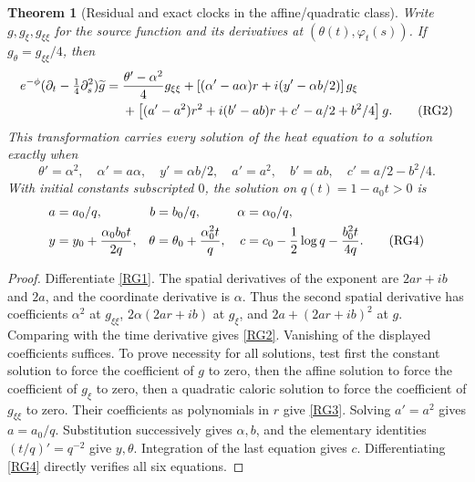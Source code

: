 \documentclass[11pt,a4paper]{article}
\newtheorem{theorem}{Theorem}[section]
\theoremstyle{definition}\newtheorem{definition}[theorem]{Definition}
\begin{document}
\begin{theorem}[Residual and exact clocks in the affine/quadratic class]
Write $g,g_\xi,g_{\xi\xi}$ for the source function and its derivatives at $(\theta(t),\varphi_t(s))$. If $g_\theta=g_{\xi\xi}/4$, then
\begin{align}
 e^{-\phi}(\partial_t-\tfrac14\partial_s^2)\widetilde g
 ={}&\frac{\theta'-\alpha^2}{4}g_{\xi\xi}
 +\left[(\alpha'-a\alpha)r+i(y'-\alpha b/2)\right]g_\xi\notag\\
 &+\left[(a'-a^2)r^2+i(b'-ab)r+c'-a/2+b^2/4\right]g.
                                                               \tag{RG2}\label{RG2}
\end{align}
This transformation carries \emph{every} solution of the heat equation to a solution exactly when
\begin{equation}
 \theta'=\alpha^2,\quad \alpha'=a\alpha,\quad
 y'=\alpha b/2,\quad a'=a^2,\quad b'=ab,\quad
 c'=a/2-b^2/4.                                                 \tag{RG3}\label{RG3}
\end{equation}
With initial constants subscripted $0$, the solution on $q(t)=1-a_0t>0$ is
\begin{align}
 a&=a_0/q,&b&=b_0/q,&\alpha&=\alpha_0/q,\notag\\
 y&=y_0+\frac{\alpha_0b_0t}{2q},&
 \theta&=\theta_0+\frac{\alpha_0^2t}{q},&
 c&=c_0-\frac12\log q-\frac{b_0^2t}{4q}.                      \tag{RG4}\label{RG4}
\end{align}
\end{theorem}
\begin{proof}
Differentiate \eqref{RG1}. The spatial derivatives of the exponent are $2ar+ib$ and $2a$, and the coordinate derivative is $\alpha$. Thus the second spatial derivative has coefficients $\alpha^2$ at $g_{\xi\xi}$, $2\alpha(2ar+ib)$ at $g_\xi$, and $2a+(2ar+ib)^2$ at $g$. Comparing with the time derivative gives \eqref{RG2}. Vanishing of the displayed coefficients suffices. To prove necessity for all solutions, test first the constant solution to force the coefficient of $g$ to zero, then the affine solution to force the coefficient of $g_\xi$ to zero, then a quadratic caloric solution to force the coefficient of $g_{\xi\xi}$ to zero. Their coefficients as polynomials in $r$ give \eqref{RG3}. Solving $a'=a^2$ gives $a=a_0/q$. Substitution successively gives $\alpha,b$, and the elementary identities $(t/q)'=q^{-2}$ give $y,\theta$. Integration of the last equation gives $c$. Differentiating \eqref{RG4} directly verifies all six equations.
\end{proof}
\end{document}
